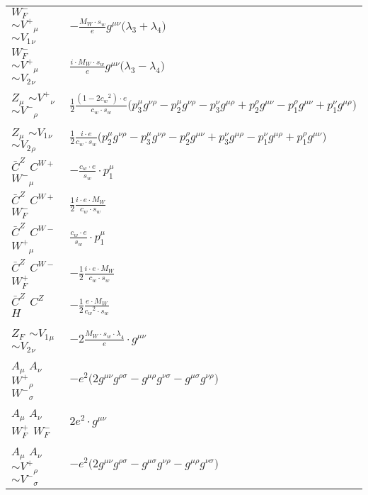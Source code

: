 \begin{center}
\begin{tabular}{|l|l|}
$W^-_F{}_{}$ \phantom{-} $\sim V^+{}_{\mu }$ \phantom{-} $\sim V_1{}_{\nu }$ \phantom{-}  &
	$-\frac{ M_W \cdot s_w}{ e}g^{\mu \nu} \big( \lambda_3+ \lambda_4\big)$\\[2mm]
$W^-_F{}_{}$ \phantom{-} $\sim V^+{}_{\mu }$ \phantom{-} $\sim V_2{}_{\nu }$ \phantom{-}  &
	$\frac{ i \cdot M_W \cdot s_w}{ e}g^{\mu \nu} \big( \lambda_3- \lambda_4\big)$\\[2mm]
${Z}_{\mu }$ \phantom{-} $\sim V^+{}_{\nu }$ \phantom{-} $\sim V^-{}_{\rho }$ \phantom{-}  &
	$\frac{1}{2}\frac{ (1-2 c_w {}^2) \cdot e}{ c_w \cdot s_w}\big(p_3^\mu g^{\nu \rho} -p_2^\mu g^{\nu \rho} -p_3^\nu g^{\mu \rho} +p_2^\rho g^{\mu \nu} -p_1^\rho g^{\mu \nu} +p_1^\nu g^{\mu \rho} \big)$\\[2mm]
${Z}_{\mu }$ \phantom{-} $\sim V_1{}_{\nu }$ \phantom{-} $\sim V_2{}_{\rho }$ \phantom{-}  &
	$\frac{1}{2}\frac{ i \cdot e}{ c_w \cdot s_w}\big(p_2^\mu g^{\nu \rho} -p_3^\mu g^{\nu \rho} -p_2^\rho g^{\mu \nu} +p_3^\nu g^{\mu \rho} -p_1^\nu g^{\mu \rho} +p_1^\rho g^{\mu \nu} \big)$\\[2mm]
$\bar{C}^{Z}{}_{}$ \phantom{-} $C^{W+}{}_{}$ \phantom{-} $W^-{}_{\mu }$ \phantom{-}  &
	$-\frac{ c_w \cdot e}{ s_w}\cdot p_1^\mu $\\[2mm]
$\bar{C}^{Z}{}_{}$ \phantom{-} $C^{W+}{}_{}$ \phantom{-} $W^-_F{}_{}$ \phantom{-}  &
	$\frac{1}{2}\frac{ i \cdot e \cdot M_W}{ c_w \cdot s_w}$\\[2mm]
$\bar{C}^{Z}{}_{}$ \phantom{-} $C^{W-}{}_{}$ \phantom{-} $W^+{}_{\mu }$ \phantom{-}  &
	$\frac{ c_w \cdot e}{ s_w}\cdot p_1^\mu $\\[2mm]
$\bar{C}^{Z}{}_{}$ \phantom{-} $C^{W-}{}_{}$ \phantom{-} $W^+_F{}_{}$ \phantom{-}  &
	$-\frac{1}{2}\frac{ i \cdot e \cdot M_W}{ c_w \cdot s_w}$\\[2mm]
$\bar{C}^{Z}{}_{}$ \phantom{-} $C^{Z}{}_{}$ \phantom{-} ${H}_{}$ \phantom{-}  &
	$-\frac{1}{2}\frac{ e \cdot M_W}{ c_w{}^2  \cdot s_w}$\\[2mm]
$Z_F{}_{}$ \phantom{-} $\sim V_1{}_{\mu }$ \phantom{-} $\sim V_2{}_{\nu }$ \phantom{-}  &
	$-2\frac{ M_W \cdot s_w \cdot \lambda_4}{ e}\cdot g^{\mu \nu} $\\[2mm]
${A}_{\mu }$ \phantom{-} ${A}_{\nu }$ \phantom{-} $W^+{}_{\rho }$ \phantom{-} $W^-{}_{\sigma }$ \phantom{-}  &
	$- e{}^2 \big(2g^{\mu \nu} g^{\rho \sigma} -g^{\mu \rho} g^{\nu \sigma} -g^{\mu \sigma} g^{\nu \rho} \big)$\\[2mm]
${A}_{\mu }$ \phantom{-} ${A}_{\nu }$ \phantom{-} $W^+_F{}_{}$ \phantom{-} $W^-_F{}_{}$ \phantom{-}  &
	$2 e{}^2 \cdot g^{\mu \nu} $\\[2mm]
${A}_{\mu }$ \phantom{-} ${A}_{\nu }$ \phantom{-} $\sim V^+{}_{\rho }$ \phantom{-} $\sim V^-{}_{\sigma }$ \phantom{-}  &
	$- e{}^2 \big(2g^{\mu \nu} g^{\rho \sigma} -g^{\mu \sigma} g^{\nu \rho} -g^{\mu \rho} g^{\nu \sigma} \big)$\\ \hline
\end{tabular}


\end{center}
